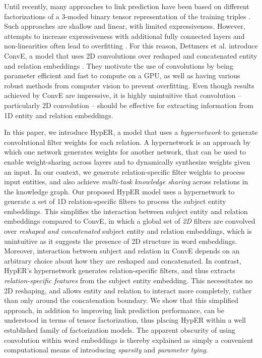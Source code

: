 \documentclass[runningheads]{llncs}
\begin{document}
Until recently, many approaches to link prediction have been based on different factorizations of a 3-moded binary tensor representation of the training triples \cite{nickel2011three,socher2013reasoning,yang2014embedding,trouillon2016complex}. Such approaches are shallow and linear, with limited expressiveness. However, attempts to increase expressiveness with additional fully connected layers and non-linearities often lead to overfitting \cite{nickel2011three,socher2013reasoning}. For this reason, Dettmers et al. introduce ConvE, a model that uses 2D convolutions over reshaped and concatenated entity and relation embeddings \cite{dettmers2017convolutional}. They motivate the use of convolutions by being parameter efficient and fast to compute on a GPU, as well as having various robust methods from computer vision to prevent overfitting. Even though results achieved by ConvE are impressive, it is highly unintuitive that convolution -- particularly 2D convolution -- should be effective for extracting information from 1D entity and relation embeddings.

In this paper, we introduce HypER, a model that uses a \emph{hypernetwork} \cite{ha2016hypernetworks} to generate convolutional filter weights for each relation. A hypernetwork is an approach by which one network generates weights for another network, that can be used to enable weight-sharing across layers and to dynamically synthesize weights given an input. In our context, we generate relation-specific filter weights to process input entities, and also achieve \emph{multi-task knowledge sharing} across relations in the knowledge graph. Our proposed HypER model uses a hypernetwork to generate a set of 1D relation-specific filters to process the subject entity embeddings. This simplifies the interaction between subject entity and relation embeddings compared to ConvE, in which a global set of \emph{2D} filters are convolved over \emph{reshaped and concatenated} subject entity and relation embeddings, which is unintuitive as it suggests the presence of 2D structure in word embeddings. Moreover, interaction between subject and relation in ConvE depends on an arbitrary choice about how they are reshaped and concatenated. In contrast, HypER's hypernetwork generates relation-specific filters, and thus extracts \emph{relation-specific features} from the subject entity embedding. This necessitates no 2D reshaping, and allows entity and relation to interact more completely, rather than only around the concatenation boundary. We show that this simplified approach, in addition to improving link prediction performance, can be understood in terms of tensor factorization, thus placing HypER within a well established family of factorization models. The apparent obscurity of using convolution within word embeddings is thereby explained as simply a convenient computational means of introducing \emph{sparsity} and \emph{parameter tying}. 
\end{document}
